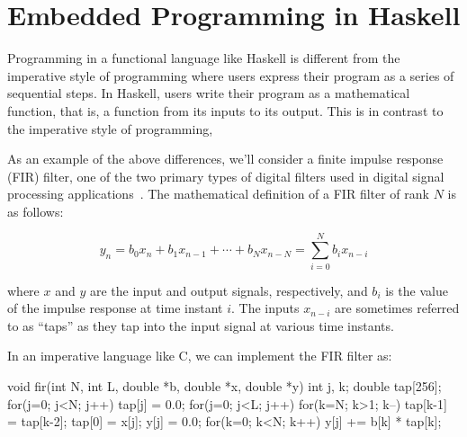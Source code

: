 \documentclass[../main.tex]{subfiles}
\begin{document}
\section{Embedded Programming in Haskell}
\label{haskell}

Programming in a functional language like Haskell is different from the imperative style of programming where users express their program as a series of sequential steps. In Haskell, users write their program as a mathematical function, that is, a function from its inputs to its output. This is in contrast to the imperative style of programming, 


As an example of the above differences, we'll consider a finite impulse response (FIR) filter, one of the two primary types of digital filters used in digital signal processing applications~\cite{oppenheim1989}. The mathematical definition of a FIR filter of rank $N$ is as follows:


\vspace{-2mm}
\begin{equation}
y_{n} = b_{0} x_{n} + b_{1} x_{n-1} + \cdots + b_{N} x_{n-N} = \sum_{i=0}^{N} b_{i} x_{n-i}
\end{equation}
\vspace{1mm}

\noindent where $x$ and $y$ are the input and output signals, respectively, and $b_i$ is the value of the impulse response at time instant $i$. The inputs $x_{n-i}$ are sometimes referred to as ``taps'' as they tap into the input signal at various time instants. 

In an imperative language like C, we can implement the FIR filter as:

\begin{code}
void fir(int N, int L, double *b, double *x, double *y)
{
 int j, k;
 double tap[256];
 for(j=0; j<N; j++) tap[j] = 0.0;
 for(j=0; j<L; j++)
 {
  for(k=N; k>1; k--) tap[k-1] = tap[k-2];
  tap[0] = x[j];
  y[j] = 0.0;
  for(k=0; k<N; k++) y[j] += b[k] * tap[k];
 }
}
\end{code}
\end{document}
